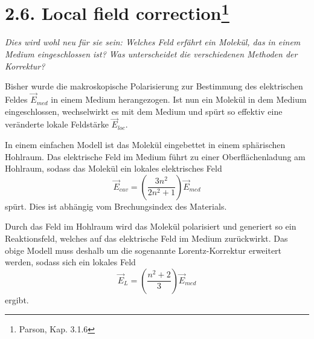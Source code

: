 \section{2.6. Local field correction\protect\footnote{Parson, Kap. 3.1.6}\hfill *} 

\textit{Dies wird wohl neu für sie sein: Welches Feld erfährt ein
Molekül, das in einem Medium eingeschlossen ist?  Was
unterscheidet die verschiedenen Methoden der Korrektur?}

Bisher wurde die makroskopische Polarisierung zur Bestimmung des elektrischen Feldes $\vec{E}_{med}$ in einem Medium herangezogen. Ist nun ein Molekül in dem Medium eingeschlossen, wechselwirkt es mit dem Medium und spürt so effektiv eine veränderte lokale Feldstärke $\vec{E}_{loc}$.

In einem einfachen Modell ist das Molekül eingebettet in einem sphärischen Hohlraum. Das elektrische Feld im Medium führt zu einer Oberflächenladung am Hohlraum, sodass das Molekül ein lokales elektrisches Feld
\begin{equation}
    \vec{E}_{cav} = \left(\frac{3n^{2}}{2n^{2}+1}\right) \vec{E}_{med}
\end{equation}
spürt. Dies ist abhängig vom Brechungsindex des Materials.

Durch das Feld im Hohlraum wird das Molekül polarisiert und generiert so ein Reaktionsfeld, welches auf das elektrische Feld im Medium zurückwirkt. Das obige Modell muss deshalb um die sogenannte Lorentz-Korrektur erweitert werden, sodass sich ein lokales Feld
\begin{equation}
    \vec{E}_{L} = \left(\frac{n^{2}+2}{3}\right) \vec{E}_{med}
\end{equation}
ergibt.



\printbibliography[segment=\therefsegment,heading=subbibliography]
